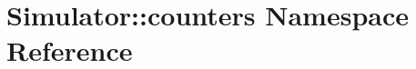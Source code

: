 \hypertarget{namespace_simulator_1_1counters}{\section{Simulator\+:\+:counters Namespace Reference}
\label{namespace_simulator_1_1counters}
}
